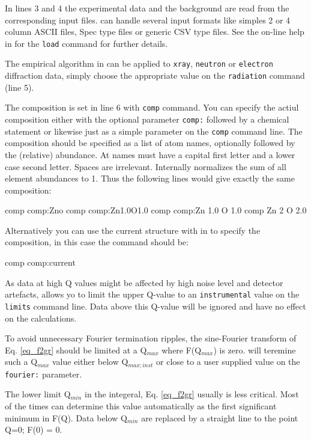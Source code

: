 In lines 3 and 4 the experimental data and the background are read from the 
corresponding input files. \Discus can handle several input formats like
simples 2 or 4 column ASCII files, Spec type files or generic CSV type files.
See the on-line help in \Kuplot for the {\tt load} command for further details.

The empirical algorithm in \Discus can be applied to {\tt xray}, {\tt neutron}
or {\tt electron} diffraction data, simply choose the appropriate value on the 
{\tt radiation} command (line 5).

The composition is set in line 6 with {\tt comp} command. You can specify the 
actiul composition either with the optional parameter {\tt comp:} followed 
by a chemical statement or likewise just as a simple parameter on the 
{\tt comp} command line. The composition should be specified as a list of
atom names, optionally followed by the (relative) abundance. At names must have
a capital first letter and a lower case second letter. Spaces are irrelevant. 
Internally \Discus normalizes the sum of all element abundances to 1.
Thus the following lines would give exactly the same composition:  

\begin{MacVerbatim}
comp comp:Zno
comp comp:Zn1.0O1.0
comp comp:Zn 1.0 O 1.0
comp Zn 2 O 2.0
\end{MacVerbatim}

Alternatively you can use the current structure with in \Discus to specify the 
composition, in this case the command should be:

\begin{MacVerbatim}
comp comp:current
\end{MacVerbatim}

As data at high Q values might be affected by high noise level and detector 
artefacts, \Discus allows yo to limit the upper Q-value to an {\tt instrumental}
value on the {\tt limits} command line. Data above this Q-value will  be 
ignored and have no effect on the calculations. 

To avoid unnecessary Fourier termination ripples, the sine-Fourier transform
of Eq. \ref{eq_f2gr} should be limited at a Q$_{max}$ where F(Q$_{max}$) is zero. 
\Discus will teremine such a Q$_{max}$ value either below Q$_{max;inst}$ or
close to a user supplied value on the {\tt fourier:} parameter.

The lower limit Q$_{min}$ in the integeral, Eq. \ref{eq_f2gr} usually is less
critical. Most of the times \Discus can determine this value automatically 
as the first significant minimum in F(Q). Data below Q$_{min}$ are replaced
by a straight line to the point Q=0; F(0) = 0.

